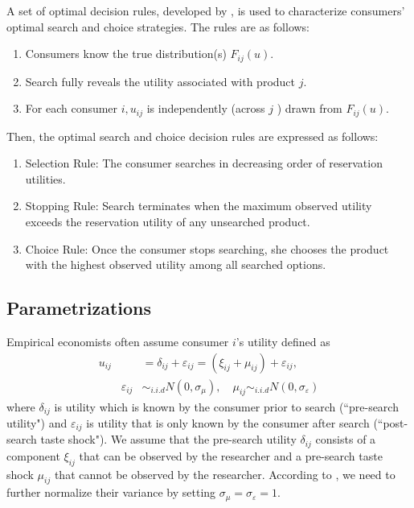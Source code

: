 \documentclass[12pt]{article}
\begin{document}
A set of optimal decision rules, developed by
\cite{weitzman1979optimal}, is used to characterize consumers' optimal search and choice strategies. 
The rules are as follows:
\begin{enumerate}
    \item Consumers know the true distribution(s) \(F_{i j}(u)\).
    \item Search fully reveals the utility associated with product \(j\).
    \item For each consumer \(i, u_{i j}\) is independently (across \(j\) ) drawn from \(F_{i j}(u)\).
\end{enumerate}
Then, the optimal search and choice decision
rules are expressed as follows:
\begin{enumerate}
    \item Selection Rule: The consumer searches in decreasing order of reservation utilities.
    \item Stopping Rule: Search terminates when the maximum observed utility exceeds the reservation utility of any unsearched product.
    \item Choice Rule: Once the consumer stops searching, she chooses the product with the highest observed utility among all searched options.
\end{enumerate}

\subsection{Parametrizations}

Empirical economists often assume consumer $i$'s utility defined as
\begin{align}
    u_{i j} & =\delta_{i j}+\varepsilon_{i j}  =\left(\xi_{i j}+\mu_{i j}\right)+\varepsilon_{i j},\nonumber\\
    \quad \quad \varepsilon_{i j}&\sim_{i.i.d} N(0,\sigma_{\mu}),\quad \mu_{i j} \sim_{i.i.d} N(0,\sigma_{\varepsilon})\nonumber
\end{align}
where \(\delta_{i j}\) is utility which is known by the consumer prior to search (``pre-search
utility") and \(\varepsilon_{i j}\) is utility that is only known by the consumer
after search (``post-search taste shock"). 
We assume that the pre-search utility
\(\delta_{i j}\) consists of a component \(\xi_{i j}\) that can be observed by the researcher and a pre-search taste shock \(\mu_{i j}\) that
cannot be observed by the researcher. 
According to \cite{ursu2023sequential}, we need to further normalize their variance by setting $\sigma_{\mu}= \sigma_{\varepsilon} =1$. 
\end{document}
